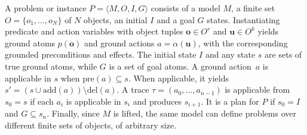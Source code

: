 A \strips problem or instance $P=\langle M,O,I,G\rangle$ consists of a
\strips model $M$, a finite set $O=\{o_1,\ldots,o_N\}$ of $N$ objects, an initial $I$ and a goal $G$ states.
Instantiating predicate and action variables with object tuples
$\mathbf{o}\in O^r$ and $\mathbf{u}\in O^k$ yields ground atoms
$p(\mathbf{o})$ and ground actions $a=\alpha(\mathbf{u})$, with the
corresponding grounded preconditions and effects.
The initial state $I$ and any state $s$ are sets of true ground atoms, while $G$ is a set of goal atoms. 
A ground action~$a$ is applicable in $s$ when $\mathrm{pre}(a)\subseteq s$. When applicable, it yields $s'=(s\cup\mathrm{add}(a))\setminus\mathrm{del}(a)$. %
A trace $\tau=(a_0,\ldots,a_{n-1})$ is applicable from $s_0=s$ if each
$a_i$ is applicable in $s_i$ and produces $s_{i+1}$. It is a plan for $P$ if $s_0=I$ and $G\subseteq s_n$.
Finally, since $M$ is lifted, the same model can define problems over different finite sets of objects, of arbitrary size.



